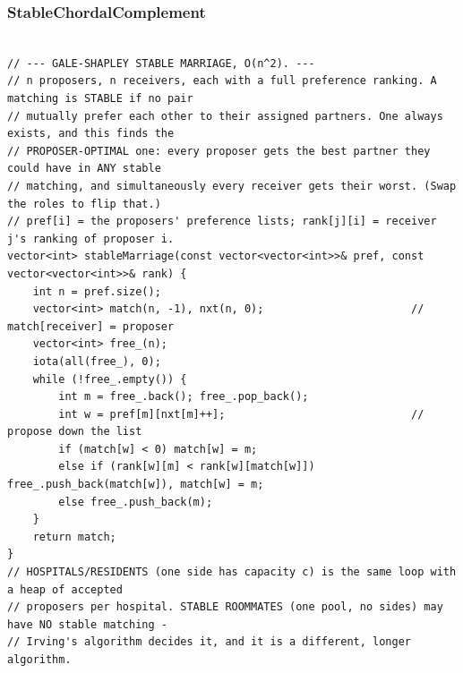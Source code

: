 \documentclass[9pt,a4paper,twocolumn]{extarticle}
\begin{document}
\subsubsection{StableChordalComplement}
\nopagebreak
\begin{lstlisting}

// --- GALE-SHAPLEY STABLE MARRIAGE, O(n^2). ---
// n proposers, n receivers, each with a full preference ranking. A matching is STABLE if no pair
// mutually prefer each other to their assigned partners. One always exists, and this finds the
// PROPOSER-OPTIMAL one: every proposer gets the best partner they could have in ANY stable
// matching, and simultaneously every receiver gets their worst. (Swap the roles to flip that.)
// pref[i] = the proposers' preference lists; rank[j][i] = receiver j's ranking of proposer i.
vector<int> stableMarriage(const vector<vector<int>>& pref, const vector<vector<int>>& rank) {
    int n = pref.size();
    vector<int> match(n, -1), nxt(n, 0);                       // match[receiver] = proposer
    vector<int> free_(n);
    iota(all(free_), 0);
    while (!free_.empty()) {
        int m = free_.back(); free_.pop_back();
        int w = pref[m][nxt[m]++];                             // propose down the list
        if (match[w] < 0) match[w] = m;
        else if (rank[w][m] < rank[w][match[w]]) free_.push_back(match[w]), match[w] = m;
        else free_.push_back(m);
    }
    return match;
}
// HOSPITALS/RESIDENTS (one side has capacity c) is the same loop with a heap of accepted
// proposers per hospital. STABLE ROOMMATES (one pool, no sides) may have NO stable matching -
// Irving's algorithm decides it, and it is a different, longer algorithm.


\end{lstlisting}
\end{document}
